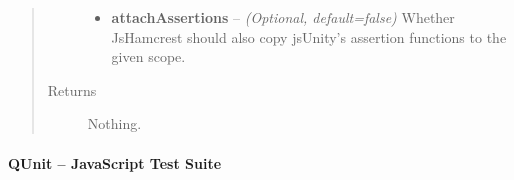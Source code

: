 \documentclass[letterpaper,10pt,english]{sphinxmanual}
\begin{document}
\begin{fulllineitems}
\begin{quote}
\begin{description}
\begin{itemize}
\item {} 
\textbf{attachAssertions} -- \emph{(Optional, default=false)} Whether JsHamcrest should
also copy jsUnity's assertion functions to the given
scope.

\end{itemize}

\item[{Returns}] \leavevmode
Nothing.

\end{description}\end{quote}

\end{fulllineitems}



\paragraph{QUnit -- JavaScript Test Suite}
\label{modules/integration:qunit-javascript-test-suite}
\end{document}
